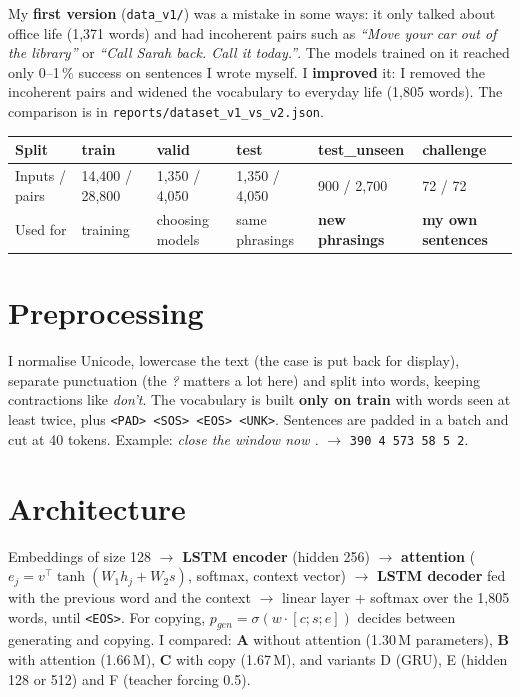 \documentclass[10pt,a4paper]{article}
\newcommand{\tok}[1]{\texttt{\small #1}}
\begin{document}
My \textbf{first version} (\texttt{data\_v1/}) was a mistake in some ways: it only talked about office
life (1,371 words) and had incoherent pairs such as \emph{``Move your car out of the library''} or
\emph{``Call Sarah back. Call it today.''}. The models trained on it reached only 0--1\,\% success on
sentences I wrote myself. I \textbf{improved} it: I removed the incoherent pairs and widened the
vocabulary to everyday life (1,805 words). The comparison is in \texttt{reports/dataset\_v1\_vs\_v2.json}.

\begin{center}
\small
\begin{tabularx}{\linewidth}{@{}lXXXXX@{}}
\toprule
Split & train & valid & test & test\_unseen & challenge \\
\midrule
Inputs / pairs & 14,400 / 28,800 & 1,350 / 4,050 & 1,350 / 4,050 & 900 / 2,700 & 72 / 72 \\
Used for & training & choosing models & same phrasings & \textbf{new phrasings} & \textbf{my own sentences} \\
\bottomrule
\end{tabularx}
\end{center}

\section{Preprocessing}
I normalise Unicode, lowercase the text (the case is put back for display), separate punctuation
(the \emph{?} matters a lot here) and split into words, keeping contractions like \emph{don't}. The
vocabulary is built \textbf{only on train} with words seen at least twice, plus
\tok{<PAD> <SOS> <EOS> <UNK>}. Sentences are padded in a batch and cut at 40 tokens.
Example: \emph{close the window now .} $\rightarrow$ \tok{390 4 573 58 5 2}.

\section{Architecture}
Embeddings of size 128 $\rightarrow$ \textbf{LSTM encoder} (hidden 256) $\rightarrow$
\textbf{attention} ($e_j = v^\top \tanh(W_1 h_j + W_2 s)$, softmax, context vector) $\rightarrow$
\textbf{LSTM decoder} fed with the previous word and the context $\rightarrow$ linear layer + softmax
over the 1,805 words, until \tok{<EOS>}. For copying, $p_{gen} = \sigma(w \cdot [c; s; e])$ decides
between generating and copying. I compared: \textbf{A} without attention (1.30\,M parameters),
\textbf{B} with attention (1.66\,M), \textbf{C} with copy (1.67\,M), and variants D (GRU), E (hidden
128 or 512) and F (teacher forcing 0.5).
\end{document}
